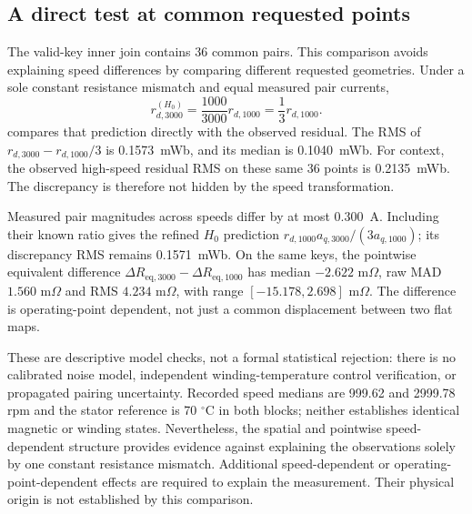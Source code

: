 \subsection{A direct test at common requested points}
The valid-key inner join contains 36 common pairs. This comparison avoids
explaining speed differences by comparing different requested geometries.
Under a sole constant resistance mismatch and equal measured pair currents,
\begin{equation}
 r_{d,3000}^{(H_0)}=\frac{1000}{3000}r_{d,1000}
 =\frac13r_{d,1000}.\label{eq:direct-speed-test}
\end{equation}
 compares that prediction directly with the
observed residual. The RMS of $r_{d,3000}-r_{d,1000}/3$ is
\SI{0.1573}{\milli\weber}, and its median is
\SI{0.1040}{\milli\weber}. For context, the observed high-speed residual
RMS on these same 36 points is \SI{0.2135}{\milli\weber}.
The discrepancy is therefore not hidden by the speed transformation.


Measured pair magnitudes across speeds differ by at most
\SI{0.300}{\ampere}. Including their known ratio gives the refined
$H_0$ prediction $r_{d,1000}a_{q,3000}/(3a_{q,1000})$;
its discrepancy RMS remains \SI{0.1571}{\milli\weber}.
On the same keys, the pointwise equivalent difference
$\Delta R_{\mathrm{eq},3000}-\Delta R_{\mathrm{eq},1000}$ has median
$-2.622$ m$\Omega$, raw MAD $1.560$ m$\Omega$ and RMS $4.234$ m$\Omega$,
with range $[-15.178,2.698]$ m$\Omega$. The difference is operating-point
dependent, not just a common displacement between two flat maps.

These are descriptive model checks, not a formal statistical rejection:
there is no calibrated noise model, independent winding-temperature control
verification, or propagated pairing uncertainty. Recorded speed medians
are 999.62 and 2999.78 rpm and the stator reference is 70 $^\circ$C in both
blocks; neither establishes identical magnetic or winding states.
Nevertheless, the spatial and pointwise speed-dependent structure provides
evidence against explaining the observations solely by one constant
resistance mismatch. Additional speed-dependent or operating-point-dependent
effects are required to explain the measurement. Their physical origin is
not established by this comparison.
